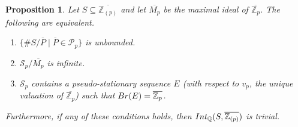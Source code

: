 \documentclass{article}
\newtheorem{Prop}[equation]{Proposition}
\theoremstyle{definition}\newtheorem{Def}[equation]{Definition}
\theoremstyle{definition}\newtheorem{Ques}[equation]{Question}
\theoremstyle{definition}\newtheorem{Conj}[equation]{Conjecture}
\theoremstyle{definition}\newtheorem{Not}[equation]{Notation}
\newcommand{\Q}{\mathbb{Q}}
\newcommand{\oP}{\overline{P}}
\newcommand{\Z}{\mathbb{Z}}
\newcommand{\oZp}{\overline{\Z_p}}
\newcommand{\oMp}{\overline{M_p}}
\newcommand{\Int}{\textnormal{Int}}
\newcommand{\IntQ}{\Int_{\Q}}
\newcommand{\Br}{\textnormal{Br}}
\newcommand{\rc}{ \color{red}}
\numberwithin{equation}{section}
\begin{document}
\begin{Prop}\label{Unbounded res field deg prop}
Let $S\subseteq\overline{\Z_{(p)}}$ and let $\oMp$ be the maximal ideal of $\oZp$. The following are equivalent.
\begin{enumerate}[(1)]
\item $\{\# S/\oP\mid\oP\in \mathcal{P}_p\}$ is unbounded.
\item $\mathcal{S}_p/\oMp$ is infinite.
\item $\mathcal{S}_p$ contains a pseudo-stationary sequence $E$ (with respect to $v_p$, the unique valuation of $\oZp$) such that $\Br(E) = \oZp$.
\end{enumerate}
Furthermore, if any of these conditions holds, then $\IntQ(S,\overline{\Z_{(p)}})$ is trivial.
\end{Prop}
\end{document}
